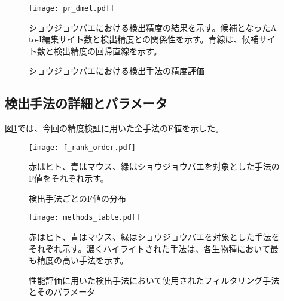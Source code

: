 \begin{figure}[!h]
	\begin{center}
		\texttt{[image: pr\_dmel.pdf]}
	\end{center}
	\caption{ショウジョウバエにおける検出手法の精度評価}
	\begin{flushleft}
		\small{ショウジョウバエにおける検出精度の結果を示す。候補となったA-to-I編集サイト数と検出精度との関係性を示す。青線は、候補サイト数と検出精度の回帰直線を示す。}
	\end{flushleft}
\end{figure}

\subsection{検出手法の詳細とパラメータ}
図\ref{fig:f_measure}では、今回の精度検証に用いた全手法のF値を示した。

\begin{figure}[!h]
	\begin{center}
		\texttt{[image: f\_rank\_order.pdf]}
	\end{center}
	\caption{検出手法ごとのF値の分布}
	\begin{flushleft}
		\small{赤はヒト、青はマウス、緑はショウジョウバエを対象とした手法のF値をそれぞれ示す。}
	\end{flushleft}
	\label{fig:f_measure}
\end{figure}

\begin{landscape}
	\begin{figure}[!h]
		\centering
		\texttt{[image: methods\_table.pdf]}
		\caption{性能評価に用いた検出手法において使用されたフィルタリング手法とそのパラメータ}
		\begin{flushleft}
			\small{赤はヒト、青はマウス、緑はショウジョウバエを対象とした手法をそれぞれ示す。濃くハイライトされた手法は、各生物種において最も精度の高い手法を示す。}
		\end{flushleft}
		\label{Fig:*****}
	\end{figure}
\end{landscape}

